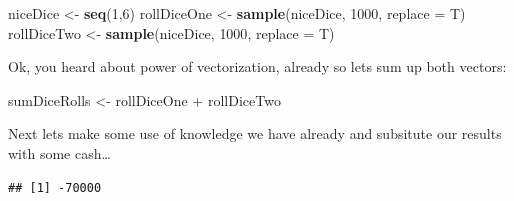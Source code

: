 \documentclass[]{book}
\newenvironment{Shaded}{\begin{snugshade}}{\end{snugshade}}
\newcommand{\KeywordTok}[1]{\textcolor[rgb]{0.12,0.11,0.11}{\textbf{#1}}}
\newcommand{\DataTypeTok}[1]{\textcolor[rgb]{0.00,0.34,0.68}{#1}}
\newcommand{\DecValTok}[1]{\textcolor[rgb]{0.69,0.50,0.00}{#1}}
\newcommand{\StringTok}[1]{\textcolor[rgb]{0.75,0.01,0.01}{#1}}
\newcommand{\OperatorTok}[1]{\textcolor[rgb]{0.12,0.11,0.11}{#1}}
\newcommand{\NormalTok}[1]{\textcolor[rgb]{0.12,0.11,0.11}{#1}}
\theoremstyle{definition}
\theoremstyle{definition}
\theoremstyle{definition}
\theoremstyle{remark}
\begin{document}
\begin{Shaded}
\begin{Highlighting}[]
\NormalTok{niceDice <-}\StringTok{ }\KeywordTok{seq}\NormalTok{(}\DecValTok{1}\NormalTok{,}\DecValTok{6}\NormalTok{)}
\NormalTok{rollDiceOne <-}\StringTok{ }\KeywordTok{sample}\NormalTok{(niceDice, }\DecValTok{1000}\NormalTok{, }\DataTypeTok{replace =}\NormalTok{ T)}
\NormalTok{rollDiceTwo <-}\StringTok{ }\KeywordTok{sample}\NormalTok{(niceDice, }\DecValTok{1000}\NormalTok{, }\DataTypeTok{replace =}\NormalTok{ T)}
\end{Highlighting}
\end{Shaded}

Ok, you heard about power of vectorization, already so lets sum up both
vectors:

\begin{Shaded}
\begin{Highlighting}[]
\NormalTok{sumDiceRolls <-}\StringTok{ }\NormalTok{rollDiceOne }\OperatorTok{+}\StringTok{ }\NormalTok{rollDiceTwo}
\end{Highlighting}
\end{Shaded}

Next lets make some use of knowledge we have already and subsitute our
results with some cash\ldots{}

\begin{Shaded}
\end{Shaded}

\begin{verbatim}
## [1] -70000
\end{verbatim}
\end{document}
